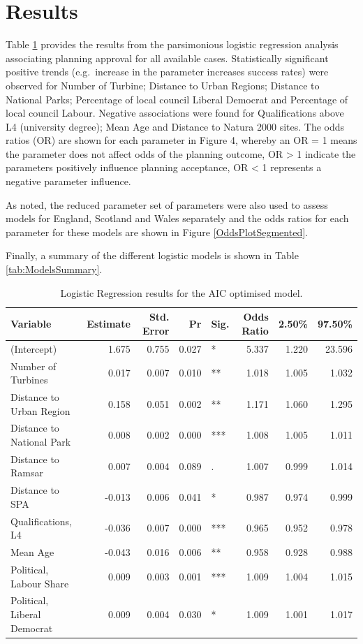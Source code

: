 \documentclass[a4paper,]{article}
\theoremstyle{definition}
\theoremstyle{definition}
\theoremstyle{remark}
\begin{document}
{\section{Results}\label{results}

Table \ref{tab:LogisticResults} provides the results from the
parsimonious logistic regression analysis associating planning approval
for all available cases. Statistically significant positive trends
(e.g.~increase in the parameter increases success rates) were observed
for Number of Turbine; Distance to Urban Regions; Distance to National
Parks; Percentage of local council Liberal Democrat and Percentage of
local council Labour. Negative associations were found for
Qualifications above L4 (university degree); Mean Age and Distance to
Natura 2000 sites. The odds ratios (OR) are shown for each parameter in
Figure 4, whereby an OR = 1 means the parameter does not affect odds of
the planning outcome, OR \textgreater{} 1 indicate the parameters
positively influence planning acceptance, OR \textless{} 1 represents a
negative parameter influence.

As noted, the reduced parameter set of parameters were also used to
assess models for England, Scotland and Wales separately and the odds
ratios for each parameter for these models are shown in Figure
\ref{OddsPlotSegmented}.

Finally, a summary of the different logistic models is shown in Table
\ref{tab:ModelsSummary}.

\begin{table}

\caption{\label{tab:LogisticResults}Logistic Regression results for the AIC optimised model.}
\centering
\begin{tabular}[t]{lrrrlrrr}
\toprule
Variable & Estimate & Std. Error & Pr & Sig. & Odds Ratio & 2.50\% & 97.50\%\\
\midrule
(Intercept) & 1.675 & 0.755 & 0.027 & * & 5.337 & 1.220 & 23.596\\
Number of Turbines & 0.017 & 0.007 & 0.010 & ** & 1.018 & 1.005 & 1.032\\
Distance to  Urban Region & 0.158 & 0.051 & 0.002 & ** & 1.171 & 1.060 & 1.295\\
Distance to National Park & 0.008 & 0.002 & 0.000 & *** & 1.008 & 1.005 & 1.011\\
Distance to Ramsar & 0.007 & 0.004 & 0.089 & . & 1.007 & 0.999 & 1.014\\
\addlinespace
Distance to SPA & -0.013 & 0.006 & 0.041 & * & 0.987 & 0.974 & 0.999\\
Qualifications, L4 & -0.036 & 0.007 & 0.000 & *** & 0.965 & 0.952 & 0.978\\
Mean Age & -0.043 & 0.016 & 0.006 & ** & 0.958 & 0.928 & 0.988\\
Political, Labour Share & 0.009 & 0.003 & 0.001 & *** & 1.009 & 1.004 & 1.015\\
Political, Liberal Democrat & 0.009 & 0.004 & 0.030 & * & 1.009 & 1.001 & 1.017\\
\bottomrule
\end{tabular}
\end{table}

}
\end{document}
